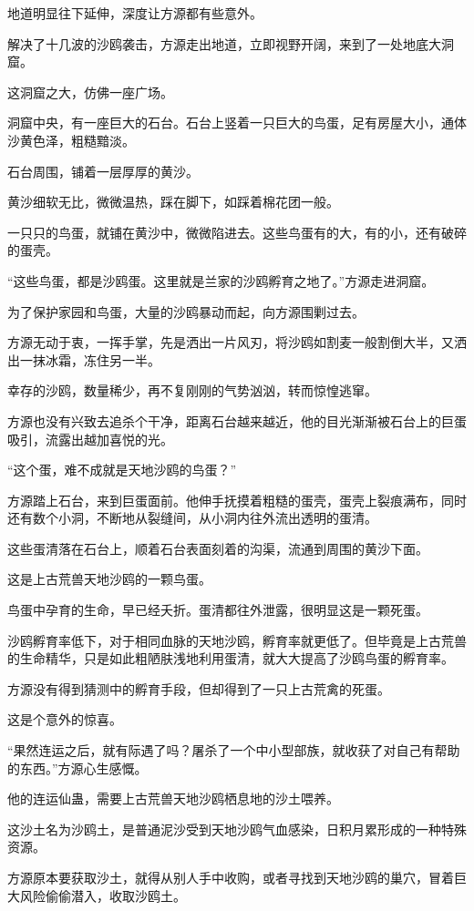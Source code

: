 \begin{this_body}
地道明显往下延伸，深度让方源都有些意外。

解决了十几波的沙鸥袭击，方源走出地道，立即视野开阔，来到了一处地底大洞窟。

这洞窟之大，仿佛一座广场。

洞窟中央，有一座巨大的石台。石台上竖着一只巨大的鸟蛋，足有房屋大小，通体沙黄色泽，粗糙黯淡。

石台周围，铺着一层厚厚的黄沙。

黄沙细软无比，微微温热，踩在脚下，如踩着棉花团一般。

一只只的鸟蛋，就铺在黄沙中，微微陷进去。这些鸟蛋有的大，有的小，还有破碎的蛋壳。

“这些鸟蛋，都是沙鸥蛋。这里就是兰家的沙鸥孵育之地了。”方源走进洞窟。

为了保护家园和鸟蛋，大量的沙鸥暴动而起，向方源围剿过去。

方源无动于衷，一挥手掌，先是洒出一片风刃，将沙鸥如割麦一般割倒大半，又洒出一抹冰霜，冻住另一半。

幸存的沙鸥，数量稀少，再不复刚刚的气势汹汹，转而惊惶逃窜。

方源也没有兴致去追杀个干净，距离石台越来越近，他的目光渐渐被石台上的巨蛋吸引，流露出越加喜悦的光。

“这个蛋，难不成就是天地沙鸥的鸟蛋？”

方源踏上石台，来到巨蛋面前。他伸手抚摸着粗糙的蛋壳，蛋壳上裂痕满布，同时还有数个小洞，不断地从裂缝间，从小洞内往外流出透明的蛋清。

这些蛋清落在石台上，顺着石台表面刻着的沟渠，流通到周围的黄沙下面。

这是上古荒兽天地沙鸥的一颗鸟蛋。

鸟蛋中孕育的生命，早已经夭折。蛋清都往外泄露，很明显这是一颗死蛋。

沙鸥孵育率低下，对于相同血脉的天地沙鸥，孵育率就更低了。但毕竟是上古荒兽的生命精华，只是如此粗陋肤浅地利用蛋清，就大大提高了沙鸥鸟蛋的孵育率。

方源没有得到猜测中的孵育手段，但却得到了一只上古荒禽的死蛋。

这是个意外的惊喜。

“果然连运之后，就有际遇了吗？屠杀了一个中小型部族，就收获了对自己有帮助的东西。”方源心生感慨。

他的连运仙蛊，需要上古荒兽天地沙鸥栖息地的沙土喂养。

这沙土名为沙鸥土，是普通泥沙受到天地沙鸥气血感染，日积月累形成的一种特殊资源。

方源原本要获取沙土，就得从别人手中收购，或者寻找到天地沙鸥的巢穴，冒着巨大风险偷偷潜入，收取沙鸥土。


\end{this_body}
